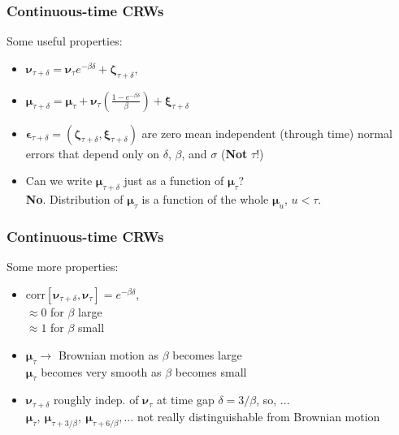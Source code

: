 \documentclass[36pt,handout]{beamer}
\newcommand{\ft}[1]{\frametitle{#1}}
\newcommand{\bigsp}{\itemsep=1.5\baselineskip}
\newcommand{\bmu}{\boldsymbol{\mu}}
\newcommand{\be}{\boldsymbol{\epsilon}}
\newcommand{\bv}{\boldsymbol{\nu}}
\begin{document}

\begin{frame}
\ft{Continuous-time CRWs}
Some useful properties: 
\medskip

\begin{itemize}
\bigsp
\item $\bv_{\tau+\delta} = \bv_\tau e^{-\beta\delta} + \boldsymbol{\zeta}_{\tau+\delta}$, 
\item $\bmu_{\tau+\delta} = \bmu_\tau + \bv_\tau\left(\frac{1-e^{-\beta\delta}}{\beta}\right) + \boldsymbol{\xi}_{\tau+\delta}$
\item $\be_{\tau+\delta} = (\boldsymbol{\zeta}_{\tau+\delta}, \boldsymbol{\xi}_{\tau+\delta})$ are zero mean independent (through time) normal errors that depend only on $\delta$, $\beta$, and $\sigma$ ({\bf Not} $\tau$!) 
\item Can we write $\bmu_{\tau+\delta}$ just as a function of $\bmu_\tau$? \medskip \\
{\bf No}. Distribution of $\bmu_\tau$ is a function of the whole $\bmu_u$, $u<\tau$.
\end{itemize}
\vfill
\end{frame}


\begin{frame}
\ft{Continuous-time CRWs}
Some more properties: 
\medskip

\begin{itemize}
\bigsp
\item $\mbox{corr}[\bv_{\tau+\delta},\bv_\tau] = e^{-\beta\delta}$,\\
$\approx 0$ for $\beta$ large\\
$\approx 1$ for $\beta$ small
\item $\bmu_\tau \to$ Brownian motion as $\beta$ becomes large\\
$\bmu_\tau$ becomes very smooth as $\beta$ becomes small
\item $\bv_{\tau+\delta}$ roughly indep. of $\bv_\tau$ at time gap $\delta = 3/\beta$, so, ...\medskip \\
$\bmu_\tau,\ \bmu_{\tau+3/\beta},\ \bmu_{\tau+6/\beta},\dots$ not really distinguishable from Brownian motion
\end{itemize}
\vfill
\end{frame}
\end{document}
